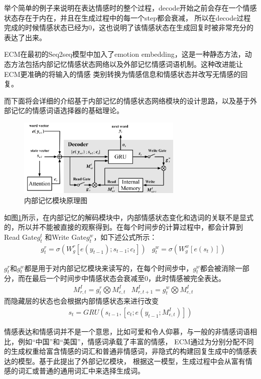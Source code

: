 \documentclass[supercite]{HustGraduPaper}
\theoremstyle{definition}
\begin{document}
举个简单的例子来说明在表达情感时的整个过程，decode开始之前会存在一个情感状态存在于内在，并且在生成过程中的每一个step都会衰减，
所以在decode过程完成的时候情感状态已经为0，这也说明了该情感状态在生成回复时被非常充分的表达了出来。

ECM在最初的Seq2seq模型中加入了emotion embedding，这是一种静态方法，动态方法包括内部记忆情感状态网络以及外部记忆情感词语机制。这种改进能让ECM更准确的将输入的情感
类别转换为情感信息和情感状态并改写无情感的回复。

而下面将会详细的介绍基于内部记忆的情感状态网络模块的设计思路，以及基于外部记忆的情感词语选择器的基础理论。

\begin{figure}[H] %
  \centering %
  \includegraphics[width=0.7\textwidth]{images/imemory.png} %
  \caption{内部记忆模块原理图} %
  \label{Fig.imemory} %
\end{figure}

如图\ref{Fig.imemory}所示，在内部记忆的解码模块中，内部情感状态变化和选词的关联不是显式的，所以并不能被直接的观察得到。在每个时间步的计算过程中，都会计算到Read Gate$g_t^t$
和Write Gate$g_t^w$，如下述公式所示：
\begin{align}
  &g_t^r = \sigma(W_g^r[e(y_{t-1});s_{t-1};c_t])
  &g_t^w = \sigma(W_g^w[e(s_t)])
\end{align}

$g_t^r$和$g_t^w$都是用于对内部记忆模块来读写的，在每个时间步中，$g_t^w$都会被消除一部分，而在最后一个时间步中情感状态会衰减至0，此时情感被完全表达。
\begin{align}
  &M_{r,t}^I = g_t^r \bigotimes M_{e,t}^I
  &M_{r,t+1}^I = g_t^w \bigotimes M_{e,t}^I
\end{align}
而隐藏层的状态也会根据内部情感状态来进行改变
\begin{align}
  s_t = GRU(s_{t-1},[c_t;e(y_{t-1};M_{e,t}^I)])
\end{align}

情感表达和情感词并不是一个意思，比如可爱和令人仰慕，与一般的非情感词语相比，例如“中国”和“美国”，情感词承载了丰富的情感，
ECM通过为分别分配不同的生成权重给富含情感的词汇和普通非情感词，非隐式的构建回复生成中的情感表达的模型。基于此提出了外部记忆模块，
根据这一模型，生成过程中会从富有情感的词汇或普通的通用词汇中来选择生成词。
\end{document}
